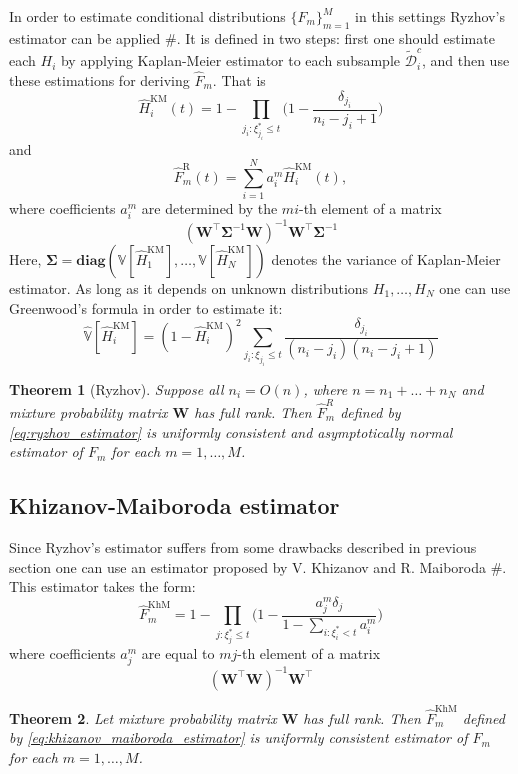 \documentclass[12pt,reqno,a4paper,oneside,draft]{article}
\theoremstyle{plain}
\newtheorem{thm}{Theorem}[section]
\theoremstyle{definition}
\theoremstyle{remark}
\begin{document}
In order to estimate conditional distributions $\{F_m\}_{m=1}^M$ in this settings Ryzhov's estimator can be applied $\#$. It is defined in two steps: first one should estimate each $H_i$ by applying Kaplan-Meier estimator to each subsample $\tilde{\mathcal D}^c_i$, and then use these estimations for deriving $\hat F_m$. That is
\begin{equation}
\hat H^{\mathrm{KM}}_i (t) = 1 - \prod _{j_i:\xi ^*_{j_i} \leq t} \Bigg(1 - \frac {\delta _{j_i}}{n_i - j_i + 1}\Bigg)
\end{equation}
and
\begin{equation}
\label{eq:ryzhov_estimator}
\hat F^{\mathrm{R}}_m(t) = \sum _{i=1}^N a_i^m \hat H^{\mathrm{KM}}_i(t),
\end{equation}
where coefficients $a_i^m$ are determined by the $mi$-th element of a matrix
\begin{equation}
(\mathbf W^\top \boldsymbol{\Sigma}^{-1}\mathbf W)^{-1} \mathbf W^\top \boldsymbol{\Sigma}^{-1}
\end{equation}
Here, $\boldsymbol{\Sigma} = \mathbf{diag}(\mathbb V [\hat H^{\mathrm{KM}}_1], \ldots, \mathbb V[\hat H^{\mathrm{KM}}_N])$ denotes the variance of Kaplan-Meier estimator. As long as it depends on unknown distributions $H_1, \ldots, H_N$ one can use Greenwood's formula in order to estimate it:
\begin{equation}
\hat{\mathbb V}[\hat H^{\mathrm{KM}}_i] = (1 - \hat H^{\mathrm{KM}}_i)^2 \sum _{j_i:\xi _{j_i} \leq t}\frac {\delta _{j_i}}{(n_i - j_i)(n_i - j_i + 1)}
\end{equation}
\begin{thm}[Ryzhov]
Suppose all $n_i = O(n)$, where $n = n_1 + \ldots + n_N$ and mixture probability matrix $\mathbf W$ has full rank. Then $\hat F^R_m$ defined by \eqref{eq:ryzhov_estimator} is uniformly consistent and asymptotically normal estimator of $F_m$ for each $m=1,\ldots , M$.
\end{thm}


\subsection{Khizanov-Maiboroda estimator}
Since Ryzhov's estimator suffers from some drawbacks described in previous section one can use an estimator proposed by V. Khizanov and R. Maiboroda $\#$. This estimator takes the form:
\begin{equation}
\label{eq:khizanov_maiboroda_estimator}
\hat F^{\mathrm{KhM}}_m = 1 - \prod _{j : \xi ^*_j \leq t}\bigg( 1 - \frac {a_j^m \delta _j}{1 - \sum _{i:\xi ^*_i < t} a_i^m} \bigg)
\end{equation}
where coefficients $a_j^m$ are equal to $mj$-th element of a matrix
\begin{equation}
(\mathbf W^\top \mathbf W)^{-1}\mathbf W^\top
\end{equation}
\begin{thm}
Let mixture probability matrix $\mathbf W$ has full rank. Then $\hat F^{\mathrm{KhM}}_m$ defined by \eqref{eq:khizanov_maiboroda_estimator} is uniformly consistent estimator of $F_m$ for each $m=1,\ldots, M$.
\end{thm}
\end{document}
